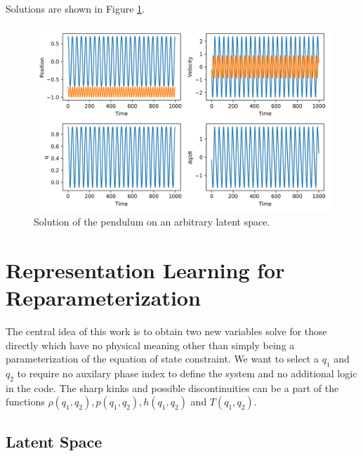 \documentclass[]{article}
\begin{document}
Solutions are shown in Figure \ref{fig:pendulum}.
\begin{figure}
\centering
\includegraphics[width=5in]{../figures/pendulum_q.png}
\caption{\label{fig:pendulum}Solution of the pendulum on an arbitrary latent space.}
\end{figure}

\hypertarget{header-n3294}{%
\section{Representation Learning for
Reparameterization}\label{header-n3294}}

The central idea of this work is to obtain two new variables solve for
those directly which have no physical meaning other than simply being a
parameterization of the equation of state constraint. We want to select a
\(q_1\) and \(q_2\) to require no auxilary phase index to define the system
and no additional logic in the code. The sharp kinks and possible
discontinuities can be a part of the functions
\(\rho(q_1, q_2), p(q_1, q_2), h(q_1, q_2)\) and \(T(q_1, q_2)\).


\hypertarget{header-n3299}{%
\subsection{Latent Space}\label{header-n3299}}
\end{document}
